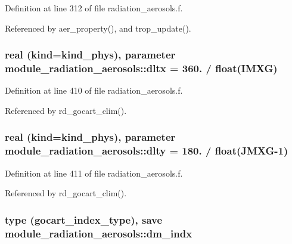 Definition at line 312 of file radiation\+\_\+aerosols.\+f.



Referenced by aer\+\_\+property(), and trop\+\_\+update().

\subsubsection[{\texorpdfstring{dltx}{dltx}}]{\setlength{\rightskip}{0pt plus 5cm}real (kind=kind\+\_\+phys), parameter module\+\_\+radiation\+\_\+aerosols\+::dltx = 360. / float(I\+M\+XG)\hspace{0.3cm}{\ttfamily [private]}}\hypertarget{namespacemodule__radiation__aerosols_a084315fde4afcad23cd3aeb18a4d8a4e}{}\label{namespacemodule__radiation__aerosols_a084315fde4afcad23cd3aeb18a4d8a4e}


Definition at line 410 of file radiation\+\_\+aerosols.\+f.



Referenced by rd\+\_\+gocart\+\_\+clim().

\subsubsection[{\texorpdfstring{dlty}{dlty}}]{\setlength{\rightskip}{0pt plus 5cm}real (kind=kind\+\_\+phys), parameter module\+\_\+radiation\+\_\+aerosols\+::dlty = 180. / float(J\+M\+XG-\/1)\hspace{0.3cm}{\ttfamily [private]}}\hypertarget{namespacemodule__radiation__aerosols_a499bb3c75e9802c5ee7fd6cdb6660f7e}{}\label{namespacemodule__radiation__aerosols_a499bb3c75e9802c5ee7fd6cdb6660f7e}


Definition at line 411 of file radiation\+\_\+aerosols.\+f.



Referenced by rd\+\_\+gocart\+\_\+clim().

\subsubsection[{\texorpdfstring{dm\+\_\+indx}{dm_indx}}]{\setlength{\rightskip}{0pt plus 5cm}type ({\bf gocart\+\_\+index\+\_\+type}), save module\+\_\+radiation\+\_\+aerosols\+::dm\+\_\+indx\hspace{0.3cm}{\ttfamily [private]}}\hypertarget{namespacemodule__radiation__aerosols_a70c58693c0aac6e4dbb6cf425fb0ce6a}{}\label{namespacemodule__radiation__aerosols_a70c58693c0aac6e4dbb6cf425fb0ce6a}


